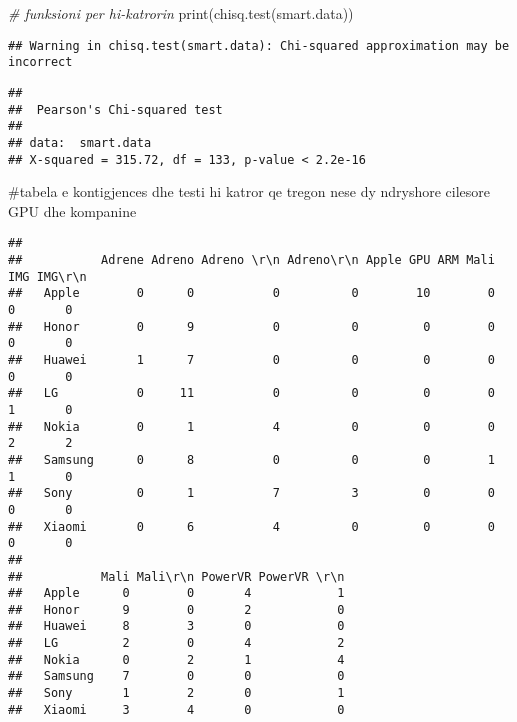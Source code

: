 \documentclass[
]{article}
\newenvironment{Shaded}{\begin{snugshade}}{\end{snugshade}}
\newcommand{\CommentTok}[1]{\textcolor[rgb]{0.56,0.35,0.01}{\textit{#1}}}
\newcommand{\FunctionTok}[1]{\textcolor[rgb]{0.00,0.00,0.00}{#1}}
\newcommand{\NormalTok}[1]{#1}
\newcommand{\SpecialCharTok}[1]{\textcolor[rgb]{0.00,0.00,0.00}{#1}}
\begin{document}
\begin{Shaded}
\begin{Highlighting}[]
\CommentTok{\# funksioni per hi{-}katrorin}
\FunctionTok{print}\NormalTok{(}\FunctionTok{chisq.test}\NormalTok{(smart.data))}
\end{Highlighting}
\end{Shaded}

\begin{verbatim}
## Warning in chisq.test(smart.data): Chi-squared approximation may be incorrect
\end{verbatim}

\begin{verbatim}
## 
##  Pearson's Chi-squared test
## 
## data:  smart.data
## X-squared = 315.72, df = 133, p-value < 2.2e-16
\end{verbatim}

\#tabela e kontigjences dhe testi hi katror qe tregon nese dy ndryshore
cilesore GPU dhe kompanine

\begin{Shaded}
\end{Shaded}

\begin{verbatim}
##          
##           Adrene Adreno Adreno \r\n Adreno\r\n Apple GPU ARM Mali IMG IMG\r\n
##   Apple        0      0           0          0        10        0   0       0
##   Honor        0      9           0          0         0        0   0       0
##   Huawei       1      7           0          0         0        0   0       0
##   LG           0     11           0          0         0        0   1       0
##   Nokia        0      1           4          0         0        0   2       2
##   Samsung      0      8           0          0         0        1   1       0
##   Sony         0      1           7          3         0        0   0       0
##   Xiaomi       0      6           4          0         0        0   0       0
##          
##           Mali Mali\r\n PowerVR PowerVR \r\n
##   Apple      0        0       4            1
##   Honor      9        0       2            0
##   Huawei     8        3       0            0
##   LG         2        0       4            2
##   Nokia      0        2       1            4
##   Samsung    7        0       0            0
##   Sony       1        2       0            1
##   Xiaomi     3        4       0            0
\end{verbatim}
\end{document}
